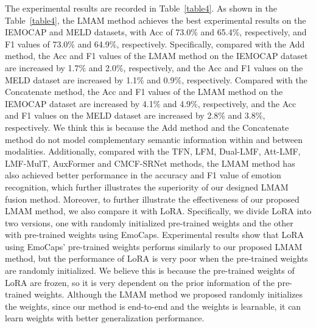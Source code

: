 {{{The experimental results are recorded in Table~\ref{table4}. As shown in the Table~\ref{table4}, the LMAM method achieves the best experimental results on the IEMOCAP and MELD datasets, with Acc of 73.0\% and 65.4\%, respectively, and F1 values of 73.0\% and 64.9\%, respectively. Specifically, compared with the Add method, the Acc and F1 values of the LMAM method on the IEMOCAP dataset are increased by 1.7\% and 2.0\%, respectively, and the Acc and F1 values on the MELD dataset are increased by 1.1\% and 0.9\%, respectively. Compared with the Concatenate method, the Acc and F1 values of the LMAM method on the IEMOCAP dataset are increased by 4.1\% and 4.9\%, respectively, and the Acc and F1 values on the MELD dataset are increased by 2.8\% and 3.8\%, respectively. We think this is because the Add method and the Concatenate method do not model complementary semantic information within and between modalities. Additionally, compared with the TFN, LFM, Dual-LMF, Att-LMF, LMF-MulT, AuxFormer and CMCF-SRNet methods, the LMAM method has also achieved better performance in the accuracy and F1 value of emotion recognition, which further illustrates the superiority of our designed LMAM fusion method. Moreover, to further illustrate the effectiveness of our proposed LMAM method, we also compare it with LoRA. Specifically, we divide LoRA into two versions, one with randomly initialized pre-trained weights and the other with pre-trained weights using EmoCaps. Experimental results show that LoRA using EmoCaps' pre-trained weights performs similarly to our proposed LMAM method, but the performance of LoRA is very poor when the pre-trained weights are randomly initialized. We believe this is because the pre-trained weights of LoRA are frozen, so it is very dependent on the prior information of the pre-trained weights. Although the LMAM method we proposed randomly initializes the weights, since our method is end-to-end and the weights is learnable, it can learn weights with better generalization performance.}

}}
